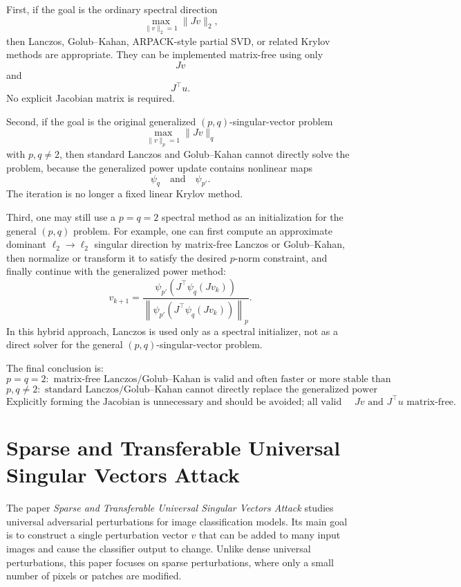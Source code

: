 \documentclass{article}
\begin{document}
First, if the goal is the ordinary spectral direction
\[
\max_{\|v\|_2=1}\|Jv\|_2,
\]
then Lanczos, Golub--Kahan, ARPACK-style partial SVD, or related Krylov methods are appropriate. They can be implemented matrix-free using only
\[
Jv
\]
and
\[
J^\top u.
\]
No explicit Jacobian matrix is required.

Second, if the goal is the original generalized \((p,q)\)-singular-vector problem
\[
\max_{\|v\|_p=1}\|Jv\|_q
\]
with \(p,q\neq 2\), then standard Lanczos and Golub--Kahan cannot directly solve the problem, because the generalized power update contains nonlinear maps
\[
\psi_q
\quad\text{and}\quad
\psi_{p'}.
\]
The iteration is no longer a fixed linear Krylov method.

Third, one may still use a \(p=q=2\) spectral method as an initialization for the general \((p,q)\) problem. For example, one can first compute an approximate dominant \(\ell_2\to\ell_2\) singular direction by matrix-free Lanczos or Golub--Kahan, then normalize or transform it to satisfy the desired \(p\)-norm constraint, and finally continue with the generalized power method:
\[
v_{k+1}
=
\frac{
\psi_{p'}
\left(
J^\top \psi_q(Jv_k)
\right)
}{
\left\|
\psi_{p'}
\left(
J^\top \psi_q(Jv_k)
\right)
\right\|_p
}.
\]
In this hybrid approach, Lanczos is used only as a spectral initializer, not as a direct solver for the general \((p,q)\)-singular-vector problem.

The final conclusion is:
\[
\boxed{
p=q=2:
\text{ matrix-free Lanczos/Golub--Kahan is valid and often faster or more stable than ordinary power iteration.}
}
\]
\[
\boxed{
p,q\neq 2:
\text{ standard Lanczos/Golub--Kahan cannot directly replace the generalized power method.}
}
\]
\[
\boxed{
\text{Explicitly forming the Jacobian is unnecessary and should be avoided; all valid approaches must use }Jv\text{ and }J^\top u\text{ matrix-free.}
}
\]

\section{Sparse and Transferable Universal Singular Vectors Attack}

The paper \emph{Sparse and Transferable Universal Singular Vectors Attack} studies universal adversarial perturbations for image classification models. Its main goal is to construct a single perturbation vector \(v\) that can be added to many input images and cause the classifier output to change. Unlike dense universal perturbations, this paper focuses on sparse perturbations, where only a small number of pixels or patches are modified.
\end{document}
